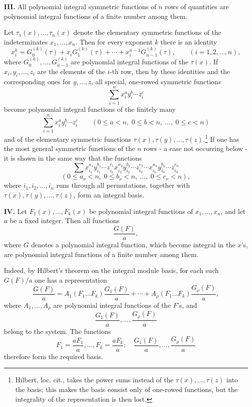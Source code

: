 \documentclass[11pt]{article}
\begin{document}
\textbf{III.} All polynomial integral symmetric functions of \(n\) rows of quantities are polynomial integral functions of a finite number among them.

Let \(\tau_1(x),\ldots,\tau_n(x)\) denote the elementary symmetric functions of the indeterminates \(x_1,\ldots,x_n\). Then for every exponent \(k\) there is an identity
\[
        x_i^k = G_0^{(k)}(\tau)+x_iG_1^{(k)}(\tau)+\cdots+x_i^{n-1}G_{n-1}^{(k)}(\tau),
        \qquad (i=1,2,\ldots,n),
\]
where \(G_0^{(k)},\ldots,G_{n-1}^{(k)}\) are polynomial integral functions of the \(\tau(x)\). If \(x_i,y_i,\ldots,z_i\) are the elements of the \(i\)-th row, then by these identities and the corresponding ones for \(y,\ldots,z\), all special, one-rowed symmetric functions
\[
        \sum_{i=1}^n x_i^{a}y_i^{b}\cdots z_i^{c}
\]
become polynomial integral functions of the finitely many
\[
        \sum_{i=1}^n x_i^{a}y_i^{b}\cdots z_i^{c}
        \qquad
        (0\le a<n,\;0\le b<n,\;\ldots,\;0\le c<n)
\]
and of the elementary symmetric functions \(\tau(x),\tau(y),\ldots,\tau(z)\).\footnote{Hilbert, loc. cit., takes the power sums instead of the \(\tau(x),\ldots,\tau(z)\) into the basis; this makes the basis consist only of one-rowed functions, but the integrality of the representation is then lost.}
If one has the most general symmetric functions of the \(n\) rows - a case not occurring below - it is shown in the same way that the functions
\[
        \sum x_{i_1}^{a_1}y_{i_1}^{b_1}\cdots z_{i_1}^{c_1}
              x_{i_2}^{a_2}y_{i_2}^{b_2}\cdots z_{i_2}^{c_2}
              \cdots
              x_{i_n}^{a_n}y_{i_n}^{b_n}\cdots z_{i_n}^{c_n}
\]
\[
        (0\le a_\nu<n,\;0\le b_\nu<n,\;\ldots,\;0\le c_\nu<n),
\]
where \(i_1,i_2,\ldots,i_n\) runs through all permutations, together with \(\tau(x),\tau(y),\ldots,\tau(z)\), form an integral basis.

\textbf{IV.} Let \(F_1(x),\ldots,F_k(x)\) be polynomial integral functions of \(x_1,\ldots,x_n\), and let \(a\) be a fixed integer. Then all functions
\[
        \frac{G(F)}{a},
\]
where \(G\) denotes a polynomial integral function, which become integral in the \(x\)'s, are polynomial integral functions of a finite number among them.

Indeed, by Hilbert's theorem on the integral module basis, for each such \(G(F)/a\) one has a representation
\[
 \frac{G(F)}{a}
 =
 A_1(F_1\ldots F_k)\frac{G_1(F)}{a}
 +\cdots+
 A_\rho(F_1\ldots F_k)\frac{G_\rho(F)}{a},
\]
where \(A_1,\ldots,A_\rho\) are polynomial integral functions of the \(F\)'s, and
\[
        \frac{G_1(F)}{a},\ldots,\frac{G_\rho(F)}{a}
\]
belong to the system. The functions
\[
        F_1=\frac{aF_1}{a},\ldots,F_k=\frac{aF_k}{a};
        \quad
        \frac{G_1(F)}{a},\ldots,\frac{G_\rho(F)}{a}
\]
therefore form the required basis.
\end{document}
